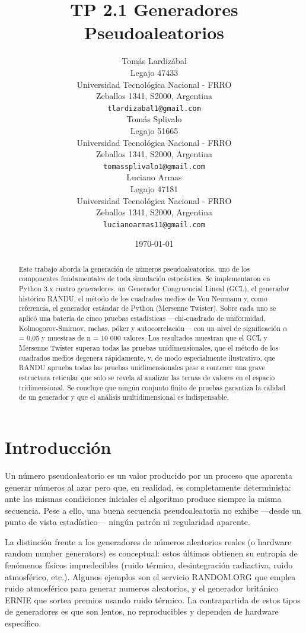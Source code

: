 \documentclass{article}
\title{TP 2.1 Generadores Pseudoaleatorios}
\author{
 Tomás Lardizábal \\
  Legajo 47433\\
  Universidad Tecnológica Nacional - FRRO\\
  Zeballos 1341, S2000, Argentina \\
  \texttt{tlardizabal1@gmail.com} \\
   \And
 Tomás Splivalo\\
  Legajo 51665 \\
  Universidad Tecnológica Nacional - FRRO\\
  Zeballos 1341, S2000, Argentina \\
  \texttt{tomassplivalo1@gmail.com} \\
    \And
 Luciano Armas\\
  Legajo 47181\\
  Universidad Tecnológica Nacional - FRRO\\
  Zeballos 1341, S2000, Argentina \\
  \texttt{lucianoarmas11@gmail.com} \\
}
\date{\today}
\begin{document}
\maketitle

\pagestyle{fancy}
\fancyhead{} %

\begin{abstract}
Este trabajo aborda la generación de números pseudoaleatorios, uno de los componentes fundamentales de toda simulación estocástica. Se implementaron en Python 3.x cuatro generadores: un Generador Congruencial Lineal (GCL), el generador histórico RANDU, el método de los cuadrados medios de Von Neumann y, como referencia, el generador estándar de Python (Mersenne Twister). Sobre cada uno se aplicó una batería de cinco pruebas estadísticas —chi-cuadrado de uniformidad, Kolmogorov-Smirnov, rachas, póker y autocorrelación— con un nivel de significación $\alpha$ = 0,05 y muestras de n = 10 000 valores. Los resultados muestran que el GCL y Mersenne Twister superan todas las pruebas unidimensionales, que el método de los cuadrados medios degenera rápidamente, y, de modo especialmente ilustrativo, que RANDU aprueba todas las pruebas unidimensionales pese a contener una grave estructura reticular que solo se revela al analizar las ternas de valores en el espacio tridimensional. Se concluye que ningún conjunto finito de pruebas garantiza la calidad de un generador y que el análisis multidimensional es indispensable.
\end{abstract}


\section{Introducción}
Un número pseudoaleatorio es un valor producido por un proceso que aparenta generar números al azar pero que, en realidad, es completamente determinista: ante las mismas condiciones iniciales el algoritmo produce siempre la misma secuencia. Pese a ello, una buena secuencia pseudoaleatoria no exhibe —desde un punto de vista estadístico— ningún patrón ni regularidad aparente.

La distinción frente a los generadores de números aleatorios reales (o hardware random number generators) es conceptual: estos últimos obtienen su entropía de fenómenos físicos impredecibles (ruido térmico, desintegración radiactiva, ruido atmosférico, etc.). Algunos ejemplos son el servicio RANDOM.ORG que emplea ruido atmosférico para generar numeros aleatorios, y el generador británico ERNIE que sortea premios usando ruido térmico. La contrapartida de estos tipos de generadores es que son lentos, no reproducibles y dependen de hardware específico. 
\end{document}
